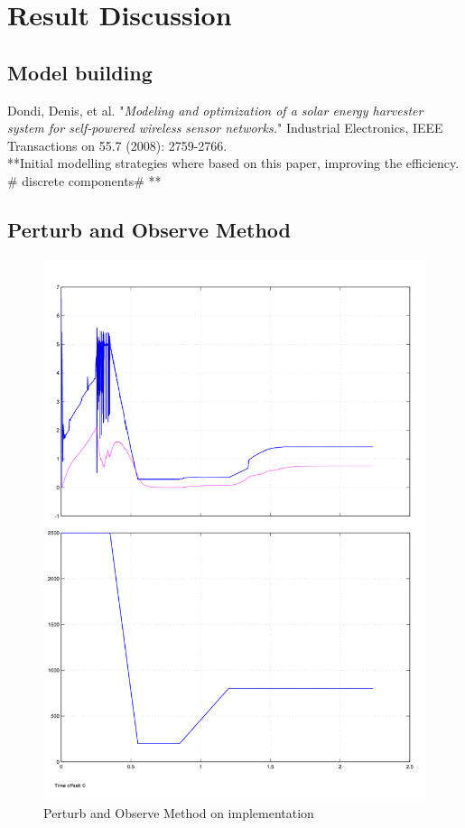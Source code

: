 \chapter{Result Discussion}
 
  \section{Model building}
  \cite{dondi2008modeling}
  Dondi, Denis, et al. "\textit{Modeling and optimization of a solar energy harvester system for self-powered wireless sensor networks.}" Industrial Electronics, IEEE Transactions on 55.7 (2008): 2759-2766.\\
  
  
  **Initial modelling strategies where based on this paper,  improving the efficiency. \# discrete components\# ** 
 
 
 
 \section{Perturb and Observe Method }
  \begin{figure}[H]
	   \begin{center}
		   \includegraphics[width=\textwidth]{images/P&O_changing_lux-1}
		   \caption{Perturb and Observe Method on implementation   }
		   \label{fig:PnO_result}
	   \end{center}
   \end{figure}
